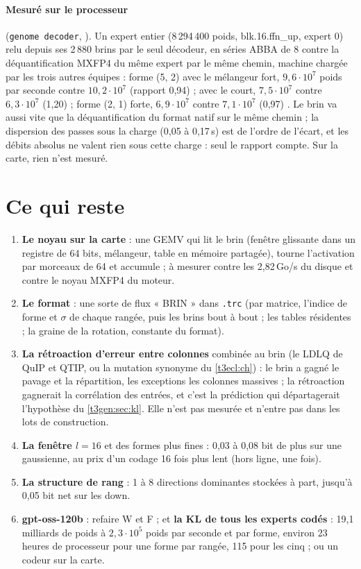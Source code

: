 \paragraph{Mesuré sur le processeur} (\texttt{genome decoder}, ). Un expert entier (8\,294\,400 poids, blk.16.ffn\_up, expert 0) relu depuis ses 2\,880 brins par le seul décodeur, en séries ABBA de 8 contre la déquantification MXFP4 du même expert par le même chemin, machine chargée par les trois autres équipes : forme (5, 2) avec le mélangeur fort, $9{,}6\cdot10^7$ poids par seconde contre $10{,}2\cdot10^7$ (rapport 0,94) ; avec le court, $7{,}5\cdot10^7$ contre $6{,}3\cdot10^7$ (1,20) ; forme (2, 1) forte, $6{,}9\cdot10^7$ contre $7{,}1\cdot10^7$ (0,97) \mes. Le brin va aussi vite que la déquantification du format natif sur le même chemin ; la dispersion des passes sous la charge (0,05 à 0,17\,s) est de l'ordre de l'écart, et les débits absolus ne valent rien sous cette charge : seul le rapport compte. Sur la carte, rien n'est mesuré.

\section{Ce qui reste}\label{t3gen:sec:reste}

\begin{enumerate}
\item \textbf{Le noyau sur la carte} : une GEMV qui lit le brin (fenêtre glissante dans un registre de 64 bits, mélangeur, table en mémoire partagée), tourne l'activation par morceaux de 64 et accumule ; à mesurer contre les 2,82\,Go/s du disque et contre le noyau MXFP4 du moteur.
\item \textbf{Le format} : une sorte de flux « BRIN » dans \texttt{.trc} (par matrice, l'indice de forme et $\sigma$ de chaque rangée, puis les brins bout à bout ; les tables résidentes ; la graine de la rotation, constante du format).
\item \textbf{La rétroaction d'erreur entre colonnes} combinée au brin (le LDLQ de QuIP et QTIP, ou la mutation synonyme du \cref{t3ecl:ch}) : le brin a gagné le pavage et la répartition, les exceptions les colonnes massives ; la rétroaction gagnerait la corrélation des entrées, et c'est la prédiction qui départagerait l'hypothèse du \cref{t3gen:sec:kl}. Elle n'est pas mesurée et n'entre pas dans les lots de construction.
\item \textbf{La fenêtre $l = 16$} et des formes plus fines : 0,03 à 0,08 bit de plus sur une gaussienne, au prix d'un codage 16 fois plus lent (hors ligne, une fois).
\item \textbf{La structure de rang} : 1 à 8 directions dominantes stockées à part, jusqu'à 0,05 bit net sur les down.
\item \textbf{gpt-oss-120b} : refaire W et F ; et \textbf{la KL de tous les experts codés} : 19,1 milliards de poids à $2{,}3\cdot10^5$ poids par seconde et par forme, environ 23 heures de processeur pour une forme par rangée, 115 pour les cinq \calc ; ou un codeur sur la carte.
\end{enumerate}

